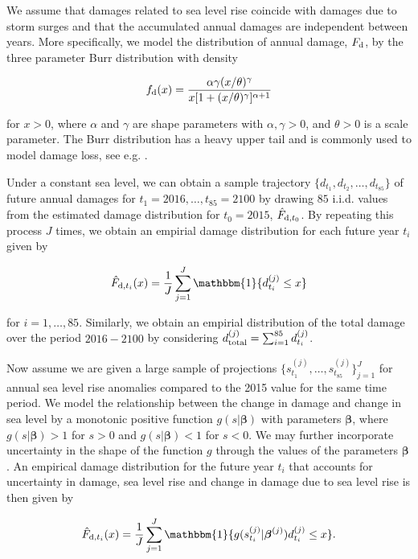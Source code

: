 \documentclass[draft,linenumbers]{agujournal}
\begin{document}
We assume that damages related to sea level rise coincide with damages due to storm surges and that the accumulated annual damages are independent between years. More specifically, we model the distribution of annual damage, $F_{\textup{d}}$, by the three parameter Burr distribution \citep{Burr1942} with density
\begin{linenomath*}
  \begin{equation}\label{eq:Burr}
  f_{\textup{d}} (x) = \frac{\alpha \gamma (x/ \theta)^{\gamma}}{x [ 1 + (x/ \theta)^{\gamma}]^{\alpha + 1}}
  \end{equation}
\end{linenomath*}
for $x > 0$, where $\alpha$ and $\gamma$ are shape parameters with $\alpha, \gamma > 0$, and $\theta >0$ is a scale parameter. The Burr distribution has a heavy upper tail and is commonly used to model damage loss, see e.g. \cite{Klugman&2012}.

Under a constant sea level, we can obtain a sample trajectory $\{d_{t_1}, d_{t_2}, \ldots, d_{t_{85}}\}$ of future annual damages for $t_1 = 2016, \ldots, t_{85} = 2100$ by drawing $85$ i.i.d. values from the estimated damage distribution for $t_0 = 2015$, $\hat{F}_{\textup{d}, t_0}$.  By repeating this process $J$ times, we obtain an empirial damage distribution for each future year $t_i$ given by
\begin{linenomath*}
  \[
  \hat{F}_{\textup{d}, t_i} (x) = \frac{1}{J} \sum_{j=1}^J \mathbbm{1}\{d_{t_i}^{(j)} \leq x \}
  \]
\end{linenomath*}
for $i = 1, \ldots, 85$. Similarly, we obtain an empirial distribution of the total damage over the period $2016-2100$ by considering $d_{\textup{total}}^{(j)} = \sum_{i=1}^{85} d_{t_i}^{(j)}$.  

Now assume we are given a large sample of projections $\{s_{t_1}^{(j)}, \ldots, s_{t_{85}}^{(j)} \}_{j=1}^J$ for annual sea level rise anomalies compared to the 2015 value for the same time period. We model the relationship between the change in damage and change in sea level by a monotonic positive function $g(s| \boldsymbol \beta )$ with parameters $\boldsymbol \beta$, where $g(s|\boldsymbol \beta ) > 1$ for $s>0$ and $g(s|\boldsymbol \beta ) < 1$ for $s < 0$. We may further incorporate uncertainty in the shape of the function $g$ through the values of the parameters $\boldsymbol \beta$. An empirical damage distribution for the future year $t_i$ that accounts for uncertainty in damage, sea level rise and change in damage due to sea level rise is then given by
\begin{linenomath*}
  \begin{equation}\label{eq:FutureDamage}
    \hat{F}_{\textup{d}, t_i} (x) = \frac{1}{J} \sum_{j=1}^J \mathbbm{1}\{g(s_{t_i}^{(j)}| \boldsymbol \beta^{(j)}) d_{t_i}^{(j)} \leq x \}.
  \end{equation}
\end{linenomath*}
\end{document}

